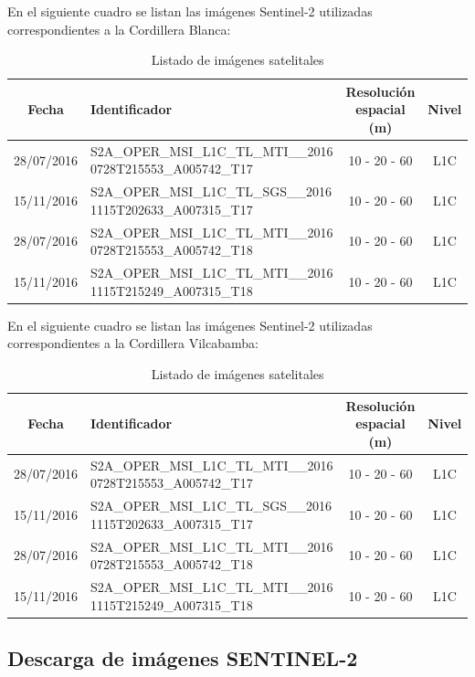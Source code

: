 \documentclass[12pt]{report}
\begin{document}
En el siguiente cuadro se listan las imágenes Sentinel-2 utilizadas correspondientes a la Cordillera Blanca:

\begin{table}[H]
   \centering
   \caption{Listado de imágenes satelitales}
   \label{tab:listado-imagenes-satelitales-blanca}
   \begin{tabularx}{1\textwidth}{cXcc} 
\hline
\textbf{Fecha} & \textbf{Identificador} & \textbf{Resolución espacial (m)} & \textbf{Nivel} \\
\hline
28/07/2016 & S2A\_OPER\_MSI\_L1C\_TL\_MTI\_\_2016
0728T215553\_A005742\_T17 & 10 - 20 - 60 & L1C \\
15/11/2016 & S2A\_OPER\_MSI\_L1C\_TL\_SGS\_\_2016
1115T202633\_A007315\_T17 & 10 - 20 - 60 & L1C \\
28/07/2016 & S2A\_OPER\_MSI\_L1C\_TL\_MTI\_\_2016
0728T215553\_A005742\_T18 & 10 - 20 - 60 & L1C \\
15/11/2016 & S2A\_OPER\_MSI\_L1C\_TL\_MTI\_\_2016
1115T215249\_A007315\_T18 & 10 - 20 - 60 & L1C \\
\hline
\end{tabularx}
\end{table}

En el siguiente cuadro se listan las imágenes Sentinel-2 utilizadas correspondientes a la Cordillera Vilcabamba:

\begin{table}[H]
   \centering
   \caption{Listado de imágenes satelitales}
   \label{tab:listado-imagenes-satelitales-vilcabamba}
   \begin{tabularx}{1\textwidth}{cXcc} 
\hline
\textbf{Fecha} & \textbf{Identificador} & \textbf{Resolución espacial (m)} & \textbf{Nivel} \\
\hline
28/07/2016 & S2A\_OPER\_MSI\_L1C\_TL\_MTI\_\_2016
0728T215553\_A005742\_T17 & 10 - 20 - 60 & L1C \\
15/11/2016 & S2A\_OPER\_MSI\_L1C\_TL\_SGS\_\_2016
1115T202633\_A007315\_T17 & 10 - 20 - 60 & L1C \\
28/07/2016 & S2A\_OPER\_MSI\_L1C\_TL\_MTI\_\_2016
0728T215553\_A005742\_T18 & 10 - 20 - 60 & L1C \\
15/11/2016 & S2A\_OPER\_MSI\_L1C\_TL\_MTI\_\_2016
1115T215249\_A007315\_T18 & 10 - 20 - 60 & L1C \\
\hline
\end{tabularx}
\end{table}

\subsection{Descarga de imágenes SENTINEL-2}
\end{document}
